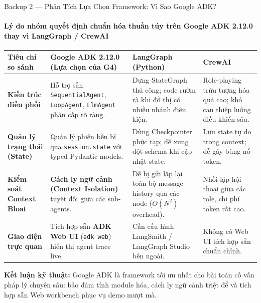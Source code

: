 \documentclass[aspectratio=169,10pt,xcolor={table}]{beamer}
\begin{document}
\begin{frame}{Backup 2 --- Phân Tích Lựa Chọn Framework: Vì Sao Google ADK?}
\framesubtitle{Lý do nhóm quyết định chuẩn hóa thuần túy trên Google ADK 2.12.0 thay vì LangGraph / CrewAI}
\centering
\scriptsize
\begin{tabularx}{0.98\linewidth}{@{}p{3.2cm} X X X@{}}
\toprule
\textbf{Tiêu chí so sánh} & \textbf{Google ADK 2.12.0 (Lựa chọn của G4)} & \textbf{LangGraph (Python)} & \textbf{CrewAI} \\ \midrule
\textbf{Kiến trúc điều phối} & Hỗ trợ sẵn \texttt{SequentialAgent}, \texttt{LoopAgent}, \texttt{LlmAgent} phân cấp rõ ràng. & Dựng StateGraph thủ công; code rườm rà khi đồ thị có nhiều nhánh điều kiện. & Role-playing trừu tượng hóa quá cao; khó can thiệp luồng điều khiển sâu. \\
\textbf{Quản lý trạng thái (State)} & Quản lý phiên bền bỉ qua \texttt{session.state} với typed Pydantic models. & Dùng Checkpointer phức tạp; dễ xung đột schema khi cập nhật state. & Lưu state tự do trong context; dễ gây bùng nổ token. \\
\textbf{Kiểm soát Context Bloat} & \textbf{Cách ly ngữ cảnh (Context Isolation)} tuyệt đối giữa các sub-agents. & Dễ bị gửi lặp lại toàn bộ message history qua các node ($O(N^2)$ overhead). & Nhồi lặp hội thoại giữa các role, chi phí token rất cao. \\
\textbf{Giao diện trực quan} & Tích hợp sẵn \textbf{ADK Web UI} (\texttt{adk web}) hiển thị agent trace live. & Cần cấu hình LangSmith / LangGraph Studio bên ngoài. & Không có Web UI tích hợp sẵn chuẩn chỉnh. \\
\bottomrule
\end{tabularx}
\vskip0.12cm
\begin{tcolorbox}[colback=hcmutblue!10,colframe=hcmutblue,boxrule=0.5pt,top=2pt,bottom=2pt,left=4pt,right=4pt]
\scriptsize\textbf{Kết luận kỹ thuật:} Google ADK là framework tối ưu nhất cho bài toán cố vấn pháp lý chuyên sâu: bảo đảm tính module hóa, cách ly ngữ cảnh triệt để và tích hợp sẵn Web workbench phục vụ demo mượt mà.
\end{tcolorbox}
\end{frame}
\end{document}
